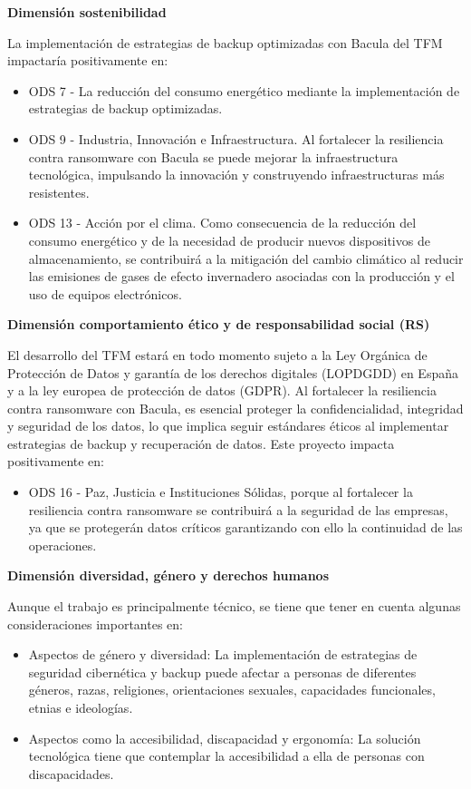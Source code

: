\textbf{Dimensión sostenibilidad}

\medskip
\hspace{1em}La implementación de estrategias de backup optimizadas con Bacula del TFM impactaría positivamente en:


\begin{itemize}
    \item ODS 7 - La reducción del consumo energético mediante la implementación de estrategias de backup optimizadas.
    \item ODS 9 - Industria, Innovación e Infraestructura. Al fortalecer la resiliencia contra ransomware con Bacula se puede mejorar la infraestructura tecnológica, impulsando la innovación y construyendo infraestructuras más resistentes.
    \item ODS 13 - Acción por el clima. Como consecuencia de la reducción del consumo energético y de la necesidad de producir nuevos dispositivos de almacenamiento, se contribuirá a la mitigación del cambio climático al reducir las emisiones de gases de efecto invernadero asociadas con la producción y el uso de equipos electrónicos.
\end{itemize}

\textbf{{Dimensión comportamiento ético y de responsabilidad social (RS)}
}\medskip

\hspace{1em}El desarrollo del TFM estará en todo momento sujeto a la Ley Orgánica de Protección de Datos y garantía de los derechos digitales (LOPDGDD) en España y a la ley europea de protección de datos (GDPR). Al fortalecer la resiliencia contra ransomware con Bacula, es esencial proteger la confidencialidad, integridad y seguridad de los datos, lo que implica seguir estándares éticos al implementar estrategias de backup y recuperación de datos. Este proyecto impacta positivamente en:

\begin{itemize}
    \item ODS 16 - Paz, Justicia e Instituciones Sólidas, porque al fortalecer la resiliencia contra ransomware se contribuirá a la seguridad de las empresas, ya que se protegerán datos críticos garantizando con ello la continuidad de las operaciones.
\end{itemize}

\textbf{{Dimensión diversidad, género y derechos humanos}
}\medskip

\hspace{1em}Aunque el trabajo es principalmente técnico, se tiene que tener en cuenta algunas consideraciones importantes en:

\begin{itemize}
    \item Aspectos de género y diversidad: La implementación de estrategias de seguridad cibernética y backup puede afectar a personas de diferentes géneros, razas, religiones, orientaciones sexuales, capacidades funcionales, etnias e ideologías.
    \item Aspectos como la accesibilidad, discapacidad y ergonomía: La solución tecnológica tiene que contemplar la accesibilidad a ella de personas con discapacidades.
\end{itemize}